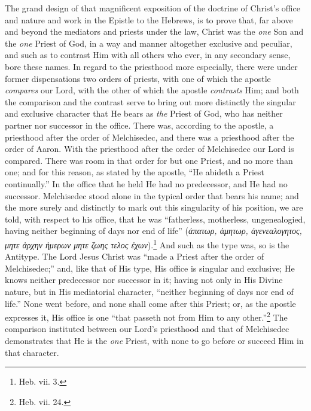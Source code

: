 \documentclass[english,]{book}
\begin{document}
The grand design of that magnificent exposition of the doctrine of Christ's office and nature and work in the Epistle to the Hebrews, is to prove that, far above and beyond the mediators and priests under the law, Christ was the \emph{one} Son and the \emph{one} Priest of God, in a way and manner altogether exclusive and peculiar, and such as to contrast Him with all others who ever, in any secondary sense, bore these names. In regard to the priesthood more especially, there were under former dispensations two orders of priests, with one of which the apostle \emph{compares} our Lord, with the other of which the apostle \emph{contrasts} Him; and both the comparison and the contrast serve to bring out more distinctly the singular and exclusive character that He bears as \emph{the} Priest of God, who has neither partner nor successor in the office. There was, according to the apostle, a priesthood after the order of Melchisedec, and there was a priesthood after the order of Aaron. With the priesthood after the order of Melchisedec our Lord is compared. There was room in that order for but one Priest, and no more than one; and for this reason, as stated by the apostle, ``He abideth a Priest continually.'' In the office that he held He had no predecessor, and He had no successor. Melchisedec stood alone in the typical order that bears his name; and the more surely and distinctly to mark out this singularity of his position, we are told, with respect to his office, that he was ``fatherless, motherless, ungenealogied, having neither beginning of days nor end of life'' (\emph{ἀπατωρ, ἀμητωρ, ἀγενεαλογητος, μητε ἀρχην ἡμερων μητε ζωης τελος ἐχων}).\footnote{Heb. vii. 3.} And such as the type was, so is the Antitype. The Lord Jesus Christ was ``made a Priest after the order of Melchisedec;'' and, like that of His type, His office is singular and exclusive; He knows neither predecessor nor successor in it; having not only in His Divine nature, but in His mediatorial character, ``neither beginning of days nor end of life.'' None went before, and none shall come after this Priest; or, as the apostle expresses it, His office is one ``that passeth not from Him to any other.''\footnote{Heb. vii. 24.} The comparison instituted between our Lord's priesthood and that of Melchisedec demonstrates that He is the \emph{one} Priest, with none to go before or succeed Him in that character.
\end{document}
